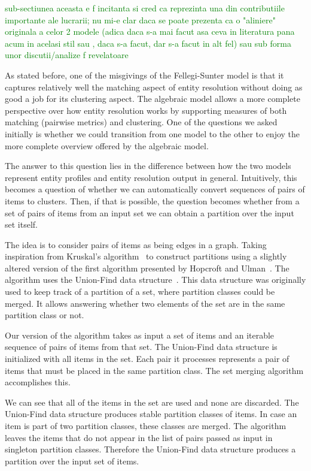 
\textcolor{green}{sub-sectiunea aceasta e f incitanta si cred ca reprezinta una din contributiile importante ale lucrarii; nu mi-e clar daca se poate prezenta ca o "aliniere" originala a celor 2 modele (adica daca s-a mai facut asa ceva in literatura pana acum in acelasi stil sau , daca s-a facut, dar s-a facut in alt fel) sau sub forma unor discutii/analize f revelatoare}
    
As stated before, one of the misgivings of the Fellegi-Sunter model is that
it captures relatively well the matching aspect of entity resolution without
doing as good a job for its clustering aspect.
The algebraic model allows a more complete perspective over how entity
resolution works by supporting measures of both matching (pairwise metrics)
and clustering.
One of the questions we asked initially is whether we could transition from
one model to the other to enjoy the more complete overview offered by the
algebraic model.

The answer to this question lies in the difference between how the two
models represent entity profiles and entity resolution output in general.
Intuitively, this becomes a question of whether we can automatically convert
sequences of pairs of items to clusters.
Then, if that is possible, the question becomes whether from a set of pairs
of items from an input set we can obtain a partition over the input set
itself.

The idea is to consider pairs of items as being edges in a graph.
Taking inspiration from Kruskal's algorithm~\cite{kruskal1956} to construct
partitions using a slightly altered version of the first algorithm presented by
Hopcroft and Ulman~\cite{hopcroft1973set}.
The algorithm uses the Union-Find data structure~\cite{unionfind1964}.
This data structure was originally used to keep track of a partition of a set,
where partition classes could be merged.
It allows answering whether two elements of the set are in the same partition
class or not.

Our version of the algorithm takes as input a set of items and an iterable
sequence of pairs of items from that set.
The Union-Find data structure is initialized with all items in the set.
Each pair it processes represents a pair of items that must be placed in the
same partition class.
The set merging algorithm accomplishes this.

We can see that all of the items in the set are used and none are discarded.
The Union-Find data structure produces stable partition classes of items.
In case an item is part of two partition classes, these classes are merged.
The algorithm leaves the items that do not appear in the list of pairs passed as
input in singleton partition classes.
Therefore the Union-Find data structure produces a partition over the input
set of items.

